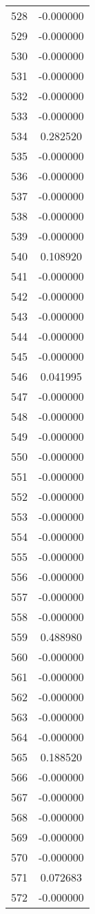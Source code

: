 \documentclass[12pt]{article}
\begin{document}
\begin{longtable}{@{}cc@{}}
528 & -0.000000 \\
529 & -0.000000 \\
530 & -0.000000 \\
531 & -0.000000 \\
532 & -0.000000 \\
533 & -0.000000 \\
534 & 0.282520 \\
535 & -0.000000 \\
536 & -0.000000 \\
537 & -0.000000 \\
538 & -0.000000 \\
539 & -0.000000 \\
540 & 0.108920 \\
541 & -0.000000 \\
542 & -0.000000 \\
543 & -0.000000 \\
544 & -0.000000 \\
545 & -0.000000 \\
546 & 0.041995 \\
547 & -0.000000 \\
548 & -0.000000 \\
549 & -0.000000 \\
550 & -0.000000 \\
551 & -0.000000 \\
552 & -0.000000 \\
553 & -0.000000 \\
554 & -0.000000 \\
555 & -0.000000 \\
556 & -0.000000 \\
557 & -0.000000 \\
558 & -0.000000 \\
559 & 0.488980 \\
560 & -0.000000 \\
561 & -0.000000 \\
562 & -0.000000 \\
563 & -0.000000 \\
564 & -0.000000 \\
565 & 0.188520 \\
566 & -0.000000 \\
567 & -0.000000 \\
568 & -0.000000 \\
569 & -0.000000 \\
570 & -0.000000 \\
571 & 0.072683 \\
572 & -0.000000 \\

\end{longtable}
\end{document}
